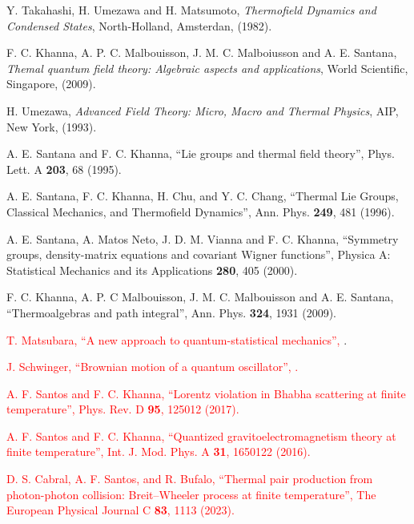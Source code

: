 \documentclass[11pt,showpacs,preprintnumbers,amsmath,amssymb,prd,nofootinbib,superscriptaddress]{revtex4-2}
\begin{document}
\begin{thebibliography}{100}
Y. Takahashi, H. Umezawa and H. Matsumoto, {\it Thermofield Dynamics and Condensed States}, North-Holland, Amsterdan, (1982).

 F. C. Khanna, A. P. C. Malbouisson, J. M. C. Malboiusson and A. E. Santana, {\it Themal quantum field theory: Algebraic aspects and applications}, World Scientific, Singapore, (2009).

 H. Umezawa, {\it Advanced Field Theory: Micro, Macro and Thermal Physics}, AIP, New York, (1993).

 A. E. Santana and F. C. Khanna, ``Lie groups and thermal field theory'',
 {Phys. Lett. A {\bf 203}, 68 (1995).}

 A. E. Santana, F. C. Khanna, H. Chu, and Y. C. Chang, ``Thermal Lie Groups, Classical Mechanics, and Thermofield Dynamics'',
 {Ann. Phys. {\bf 249}, 481 (1996).}

A. E. Santana, A. Matos Neto, J. D. M. Vianna and F. C. Khanna, ``Symmetry groups, density-matrix equations and covariant Wigner functions'', 
 {Physica A: Statistical Mechanics and its Applications {\bf 280}, 405 (2000).}


F. C. Khanna, A. P. C Malbouisson, J. M. C. Malbouisson and A. E. Santana, ``Thermoalgebras and path integral'',
 {Ann. Phys. {\bf 324}, 1931 (2009).}

\textcolor{red}{ T. Matsubara, ``A new approach to quantum-statistical mechanics'', }.

\textcolor{red}{ J. Schwinger, ``Brownian motion of a quantum oscillator'', .}

\textcolor{red}{ A. F. Santos and F. C. Khanna, ``Lorentz violation in Bhabha scattering at finite temperature'',  {Phys. Rev. D {\bf 95}, 125012 (2017).}}

\textcolor{red}{ A. F. Santos and F. C. Khanna, ``Quantized gravitoelectromagnetism theory at finite temperature'',  {Int. J. Mod. Phys. A {\bf 31}, 1650122 (2016).}}

\textcolor{red}{ D. S. Cabral, A. F. Santos, and R. Bufalo, ``Thermal pair production from photon-photon collision: Breit--Wheeler process at finite temperature'',  {The European Physical Journal C {\bf 83}, 1113 (2023).}}


\end{thebibliography}
\end{document}
